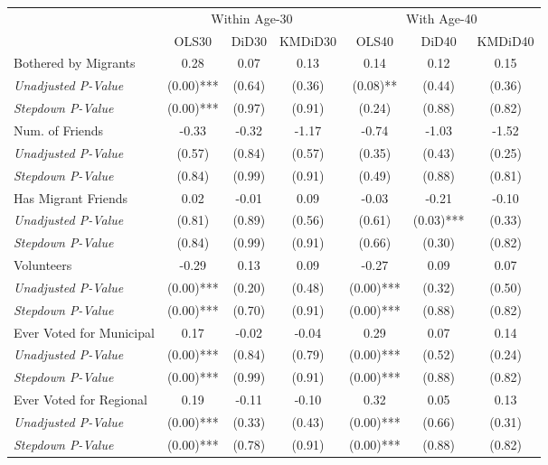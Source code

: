 \begin{tabular}{l c c c c c c}
\toprule
& \multicolumn{3}{c}{Within Age-30} & \multicolumn{3}{c}{With Age-40} \\\cmidrule(lr){2-4} \cmidrule(lr){5-7}
 & OLS30 & DiD30 & KMDiD30 & OLS40 & DiD40 & KMDiD40 \\
\midrule
Bothered by Migrants & 0.28 & 0.07 & 0.13 & 0.14 & 0.12 & 0.15 \\
\quad \textit{Unadjusted P-Value} & (0.00)*** & (0.64) & (0.36) & (0.08)** & (0.44) & (0.36) \\
\quad \textit{Stepdown P-Value} & (0.00)*** & (0.97) & (0.91) & (0.24) & (0.88) & (0.82) \\
Num. of Friends & -0.33 & -0.32 & -1.17 & -0.74 & -1.03 & -1.52 \\
\quad \textit{Unadjusted P-Value} & (0.57) & (0.84) & (0.57) & (0.35) & (0.43) & (0.25) \\
\quad \textit{Stepdown P-Value} & (0.84) & (0.99) & (0.91) & (0.49) & (0.88) & (0.81) \\
Has Migrant Friends & 0.02 & -0.01 & 0.09 & -0.03 & -0.21 & -0.10 \\
\quad \textit{Unadjusted P-Value} & (0.81) & (0.89) & (0.56) & (0.61) & (0.03)*** & (0.33) \\
\quad \textit{Stepdown P-Value} & (0.84) & (0.99) & (0.91) & (0.66) & (0.30) & (0.82) \\
Volunteers & -0.29 & 0.13 & 0.09 & -0.27 & 0.09 & 0.07 \\
\quad \textit{Unadjusted P-Value} & (0.00)*** & (0.20) & (0.48) & (0.00)*** & (0.32) & (0.50) \\
\quad \textit{Stepdown P-Value} & (0.00)*** & (0.70) & (0.91) & (0.00)*** & (0.88) & (0.82) \\
Ever Voted for Municipal & 0.17 & -0.02 & -0.04 & 0.29 & 0.07 & 0.14 \\
\quad \textit{Unadjusted P-Value} & (0.00)*** & (0.84) & (0.79) & (0.00)*** & (0.52) & (0.24) \\
\quad \textit{Stepdown P-Value} & (0.00)*** & (0.99) & (0.91) & (0.00)*** & (0.88) & (0.82) \\
Ever Voted for Regional & 0.19 & -0.11 & -0.10 & 0.32 & 0.05 & 0.13 \\
\quad \textit{Unadjusted P-Value} & (0.00)*** & (0.33) & (0.43) & (0.00)*** & (0.66) & (0.31) \\
\quad \textit{Stepdown P-Value} & (0.00)*** & (0.78) & (0.91) & (0.00)*** & (0.88) & (0.82) \\
\bottomrule
\end{tabular}
